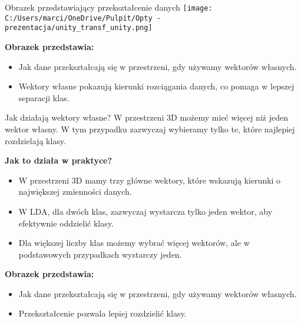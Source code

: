 \documentclass{beamer}
\begin{document}
\begin{frame}{Obrazek przedstawiający przekształcenie danych}
    \texttt{[image: C:/Users/marci/OneDrive/Pulpit/Opty - prezentacja/unity\_transf\_unity.png]}
    
    \bigskip
    \textbf{Obrazek przedstawia:}
    \begin{itemize}
        \item Jak dane przekształcają się w przestrzeni, gdy używamy wektorów własnych.
        \item Wektory własne pokazują kierunki rozciągania danych, co pomaga w lepszej separacji klas.
    \end{itemize}
\end{frame}



\begin{frame}{Jak działają wektory własne?}
    W przestrzeni 3D możemy mieć więcej niż jeden wektor własny. W tym przypadku zazwyczaj wybieramy tylko te, które najlepiej rozdzielają klasy.

    \bigskip
    \textbf{Jak to działa w praktyce?}  
    \begin{itemize}
        \item W przestrzeni 3D mamy trzy główne wektory, które wskazują kierunki o największej zmienności danych.
        \item W LDA, dla dwóch klas, zazwyczaj wystarcza tylko jeden wektor, aby efektywnie oddzielić klasy.
        \item Dla większej liczby klas możemy wybrać więcej wektorów, ale w podstawowych przypadkach wystarczy jeden.
    \end{itemize}

    \bigskip
    \textbf{Obrazek przedstawia:}
    \begin{itemize}
        \item Jak dane przekształcają się w przestrzeni, gdy używamy wektorów własnych.
        \item Przekształcenie pozwala lepiej rozdzielić klasy.
    \end{itemize}

\end{frame}
\end{document}
